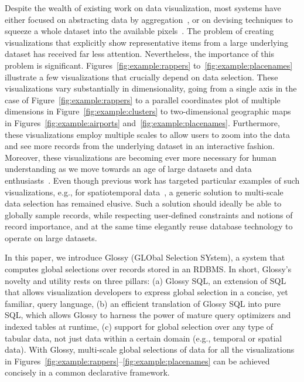 \documentclass[11pt, oneside]{report}
\begin{document}
Despite the wealth of existing work on data visualization, most systems have either focused on abstracting data by aggregation~\cite{blais:generating,LinsKS13:Nanocubes,StolteTH:2003:Multiscale,vartak:seedb}, or on devising techniques to squeeze a whole dataset into the available pixels~\cite{KeimK95:VisDB,KruskalW78:MDS}. The problem of creating visualizations that explicitly show representative items from a large underlying dataset has received far less attention. Nevertheless, the importance of this problem is significant. Figures~\ref{fig:example:rappers} to~\ref{fig:example:placenames} illustrate a few visualizations that crucially depend on data selection. These visualizations vary substantially in dimensionality, going from a single axis in the case of Figure~\ref{fig:example:rappers} to a parallel coordinates plot of multiple dimensions in Figure~\ref{fig:example:clusters} to two-dimensional geographic maps in Figures~\ref{fig:example:airports} and~\ref{fig:example:placenames}. Furthermore, these visualizations employ multiple scales to allow users to zoom into the data and see more records from the underlying dataset in an interactive fashion. Moreover, these visualizations are becoming ever more necessary for human understanding as we move towards an age of large datasets and data enthusiasts~\cite{hanrahan:enthusiast,markl:breaking}. Even though previous work has targeted particular examples of such visualizations, e.g., for spatiotemporal data~\cite{jugel:m4,KefaloukosSZ14:CVL,DasSarmaLGMH12:FusionTables}, a generic solution to multi-scale data selection has remained elusive. Such a solution should ideally be able to globally sample records, while respecting user-defined constraints and notions of record importance, and at the same time elegantly reuse database technology to operate on large datasets.   


In this paper, we introduce Glossy (GLObal Selection SYstem), a system that computes global selections over records stored in an RDBMS. In short, Glossy's novelty and utility rests on three pillars: (a) Glossy SQL, an extension of SQL that allows visualization developers to express global selection in a concise, yet familiar, query language, (b) an efficient translation of Glossy SQL into pure SQL, which allows Glossy to harness the power of mature query optimizers and indexed tables at runtime, (c) support for global selection over any type of tabular data, not just data within a certain domain (e.g., temporal or spatial data). With Glossy, multi-scale global selections of data for all the visualizations in Figures~\ref{fig:example:rappers}--\ref{fig:example:placenames} can be achieved concisely in a common declarative framework.  
\end{document}
